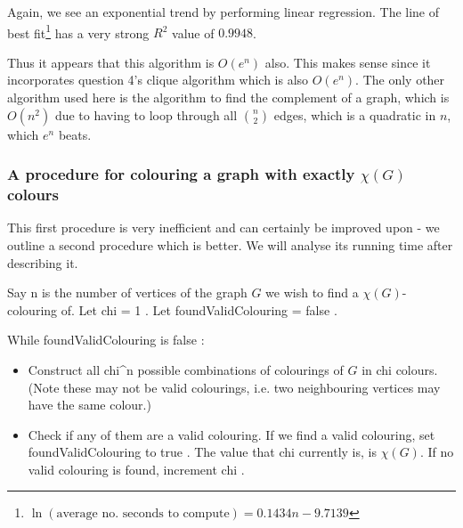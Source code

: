\documentclass{article}
\newcommand{\programquote}[1]{\fontfamily{pcr}\selectfont 
				#1\normalfont
			}
\begin{document}
Again, we see an exponential trend by performing linear regression. The line of best fit\footnote{$\ln(\text{average no. seconds to compute}) = 0.1434n-9.7139$} has a very strong $R^2$ value of $0.9948$.

\begin{center}
\end{center}

Thus it appears that this algorithm is $O(e^n)$ also. This makes sense since it incorporates question 4's clique algorithm which is also $O(e^n)$. The only other algorithm used here is the algorithm to find the complement of a graph, which is $O(n^2)$ due to having to loop through all $\binom{n}{2}$ edges, which is a quadratic in $n$, which $e^n$ beats.

\subsubsection{A procedure for colouring a graph with exactly $\chi(G)$ colours}

This first procedure is very inefficient and can certainly be improved upon - we outline a second procedure which is better. We will analyse its running time after describing it.

Say \programquote{n} is the number of vertices of the graph $G$ we wish to find a $\chi(G)$-colouring of. Let \programquote{chi = 1}. Let \programquote{foundValidColouring = false}.

While \programquote{foundValidColouring} is \programquote{false}:
\begin{itemize}
	\item Construct all \programquote{chi\string^n} possible combinations of colourings of $G$ in \programquote{chi} colours. (Note these may not be valid colourings, i.e. two neighbouring vertices may have the same colour.)
	\item Check if any of them are a valid colouring.
	\subitem If we find a valid colouring, set \programquote{foundValidColouring} to \programquote{true}. The value that \programquote{chi} currently is, is $\chi(G)$.
	\subitem If no valid colouring is found, increment \programquote{chi}.
 \end{itemize}
 
\end{document}
